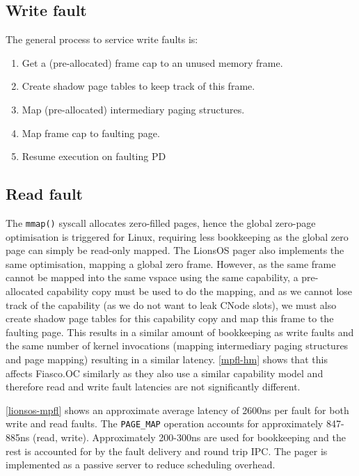 \documentclass{article}
\begin{document}
\subsection{Write fault}
The general process to service write faults is: \begin{enumerate}
    \item Get a (pre-allocated) frame cap to an unused memory frame.
    \item Create shadow page tables to keep track of this frame.
    \item Map (pre-allocated) intermediary paging structures.
    \item Map frame cap to faulting page.
    \item Resume execution on faulting PD
\end{enumerate}

\subsection{Read fault}
The \texttt{mmap()} syscall allocates zero-filled pages, hence the global zero-page optimisation is triggered for Linux, requiring less bookkeeping as the global zero page can simply be read-only mapped.
The LionsOS pager also implements the same optimisation, mapping a global zero frame.
However, as the same frame cannot be mapped into the same vspace using the same capability, a pre-allocated capability copy must be used to do the mapping, and as we cannot lose track of the capability (as we do not want to leak CNode slots), we must also create shadow page tables for this capability copy and map this frame to the faulting page.
This results in a similar amount of bookkeeping as write faults and the same number of kernel invocations (mapping intermediary paging structures and page mapping) resulting in a similar latency.
\autoref{mpfl-hm} shows that this affects Fiasco.OC similarly as they also use a similar capability model and therefore read and write fault latencies are not significantly different.

\autoref{lionsos-mpfl} shows an approximate average latency of 2600ns per fault for both write and read faults. The \texttt{PAGE\_MAP} operation accounts for approximately 847-885ns (read, write). Approximately 200-300ns are used for bookkeeping and the rest is accounted for by the fault delivery and round trip IPC. The pager is implemented as a passive server to reduce scheduling overhead.

\end{document}
